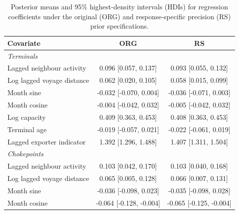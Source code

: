 \documentclass[pdftex,12pt,openright,a4paper,oneside]{book}
\begin{document}
\begin{table}[htbp]
\centering
\small
\caption{Posterior means and 95\% highest-density intervals
(HDIs) for regression coefficients under the original
(ORG) and response-specific precision (RS) prior specifications.}
\label{tab:prior_sensitivity_coefficients}

\begin{tabular}{lcc}
\toprule
Covariate & ORG & RS \\
\midrule

\multicolumn{3}{l}{\textit{Terminals}} \\
\midrule

Lagged neighbour activity
& 0.096 [0.057, 0.137]
& 0.093 [0.055, 0.132] \\

Log lagged voyage distance
& 0.062 [0.020, 0.105]
& 0.058 [0.015, 0.099] \\

Month sine
& -0.032 [-0.070, 0.004]
& -0.036 [-0.071, 0.003] \\

Month cosine
& -0.004 [-0.042, 0.032]
& -0.005 [-0.042, 0.032] \\

Log capacity
& 0.409 [0.363, 0.453]
& 0.408 [0.363, 0.453] \\

Terminal age
& -0.019 [-0.057, 0.021]
& -0.022 [-0.061, 0.019] \\

Lagged exporter indicator
& 1.392 [1.296, 1.488]
& 1.407 [1.311, 1.504] \\

\midrule
\multicolumn{3}{l}{\textit{Chokepoints}} \\
\midrule

Lagged neighbour activity
& 0.103 [0.042, 0.170]
& 0.103 [0.040, 0.168] \\

Log lagged voyage distance
& 0.065 [0.005, 0.128]
& 0.066 [0.007, 0.131] \\

Month sine
& -0.036 [-0.098, 0.023]
& -0.035 [-0.098, 0.028] \\

Month cosine
& -0.064 [-0.128, -0.004]
& -0.065 [-0.125, -0.004] \\

\bottomrule
\end{tabular}
\end{table}
\end{document}
